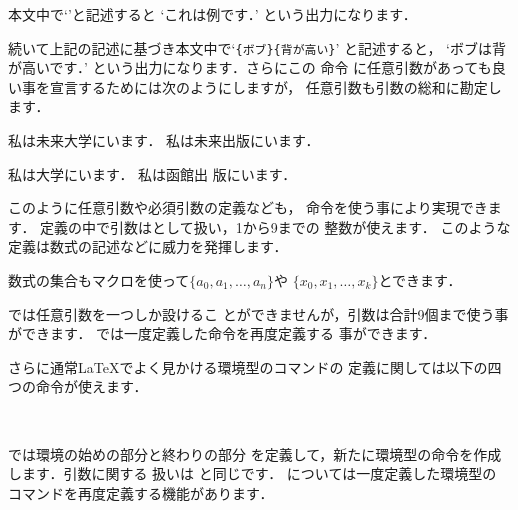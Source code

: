 \begin{InTeX}
\newcommand{\example}{これは例です．}
\end{InTeX}

本文中で`'と記述すると
`これは例です．'
という出力になります．

\begin{InTeX}
\newcommand{\example}[2]{#1は#2です．}
\end{InTeX}

続いて上記の記述に基づき本文中で`\verb|{ボブ}{背が高い}|'
と記述すると，
`ボブは背が高いです．'
という出力になります．さらにこの 命令
に任意引数があっても良い事を宣言するためには次のようにしますが，
任意引数も引数の総和に勘定します．
\begin{InOut}
\newcommand{\example}[2][未来]{%
  私は#1#2にいます．}
\example{大学}   \example{出版}\par
\example[]{大学} \example[函館]{出
版}
\end{InOut}
このように任意引数や必須引数の定義なども，
命令を使う事により実現できます．
定義の中で引数は\qu{\texttt\#}として扱い，1から9までの
整数が使えます．
このような定義は数式の記述などに威力を発揮します．
\begin{InOut}
\newcommand{\seq}[2][n]{%
 \{#2_{0},#2_{1},\ldots,#2_{#1}\}}
数式の集合もマクロを使って$\seq{a}$や
$\seq[k]{x}$とできます．
\end{InOut}

では任意引数を一つしか設けるこ
とができませんが，引数は合計9個まで使う事ができます．
では一度定義した命令を再度定義する
事ができます．

さらに通常{\LaTeX}でよく見かける環境型のコマンドの
定義に関しては以下の四つの命令が使えます．
\begin{Syntax}
%
 \\
%
\end{Syntax}
では環境の始めの部分と終わりの部分
を定義して，新たに環境型の命令を作成します．引数に関する
扱いは と同じです．
については一度定義した環境型の
コマンドを再度定義する機能があります．

